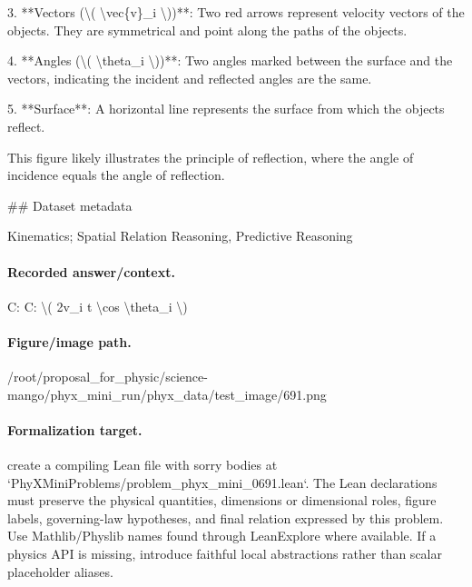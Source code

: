 3. **Vectors (\textbackslash{}( \textbackslash{}vec\{v\}\_i \textbackslash{}))**: Two red arrows represent velocity vectors of the objects. They are symmetrical and point along the paths of the objects.

4. **Angles (\textbackslash{}( \textbackslash{}theta\_i \textbackslash{}))**: Two angles marked between the surface and the vectors, indicating the incident and reflected angles are the same.

5. **Surface**: A horizontal line represents the surface from which the objects reflect.

This figure likely illustrates the principle of reflection, where the angle of incidence equals the angle of reflection.

\#\# Dataset metadata

Kinematics; Spatial Relation Reasoning, Predictive Reasoning

\paragraph{Recorded answer/context.}
C: C: \textbackslash{}( 2v\_i t \textbackslash{}cos \textbackslash{}theta\_i \textbackslash{})

\paragraph{Figure/image path.}
/root/proposal\_for\_physic/science-mango/phyx\_mini\_run/phyx\_data/test\_image/691.png

\paragraph{Formalization target.}
create a compiling Lean file with sorry bodies at `PhyXMiniProblems/problem\_phyx\_mini\_0691.lean`. The Lean declarations must preserve the physical quantities, dimensions or dimensional roles, figure labels, governing-law hypotheses, and final relation expressed by this problem.
Use Mathlib/Physlib names found through LeanExplore where available. If a physics API is missing, introduce faithful local abstractions rather than scalar placeholder aliases.

